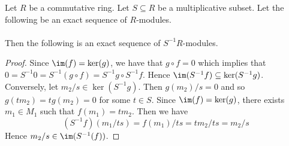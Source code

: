 \documentclass[a4paper]{article}
\begin{document}
\begin{prp}{}{} Let $R$ be a commutative ring. Let $S\subseteq R$ be a multiplicative subset. Let the following be an exact sequence of $R$-modules. \\
\\
Then the following is an exact sequence of $S^{-1}R$-modules. \\
\begin{proof}
Since $\im(f)=\ker(g)$, we have that $g\circ f=0$ which implies that $0=S^{-1}0=S^{-1}(g\circ f)=S^{-1}g\circ S^{-1}f$. Hence $\im(S^{-1}f)\subseteq\ker(S^{-1}g)$. Conversely, let $m_2/s\in\ker(S^{-1}g)$. Then $g(m_2)/s=0$ and so $g(tm_2)=tg(m_2)=0$ for some $t\in S$. Since $\im(f)=\ker(g)$, there exists $m_1\in M_1$ such that $f(m_1)=tm_2$. Then we have $$(S^{-1}f)(m_1/ts)=f(m_1)/ts=tm_2/ts=m_2/s$$ Hence $m_2/s\in\im(S^{-1}(f))$. 
\end{proof}
\end{prp}
\end{document}
